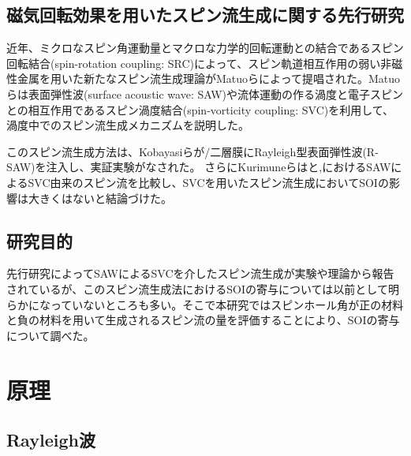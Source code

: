 \documentclass[dvipdfmx,11pt]{jsreport}
\numberwithin{equation}{chapter}
\numberwithin{table}{chapter}
\begin{document}
\section{磁気回転効果を用いたスピン流生成に関する先行研究}
近年、ミクロなスピン角運動量とマクロな力学的回転運動との結合であるスピン回転結合(spin-rotation coupling: SRC)によって、スピン軌道相互作用の弱い非磁性金属を用いた新たなスピン流生成理論がMatuoらによって提唱された\cite{PhysRevB.87.180402}。Matuoらは表面弾性波(surface acoustic wave: SAW)や流体運動の作る渦度と電子スピンとの相互作用であるスピン渦度結合(spin-vorticity coupling: SVC)を利用して、渦度中でのスピン流生成メカニズムを説明した。

このスピン流生成方法は、Kobayasiらが/二層膜にRayleigh型表面弾性波(R-SAW)を注入し、実証実験がなされた\cite{PhysRevLett.119.077202}。
さらにKurimuneらはと,におけるSAWによるSVC由来のスピン流を比較し、SVCを用いたスピン流生成においてSOIの影響は大きくはないと結論づけた\cite{PhysRevB.102.174413}。
\section{研究目的}
先行研究によってSAWによるSVCを介したスピン流生成が実験や理論から報告されているが、このスピン流生成法におけるSOIの寄与については以前として明らかになっていないところも多い。そこで本研究ではスピンホール角が正の材料と負の材料を用いて生成されるスピン流の量を評価することにより、SOIの寄与について調べた。
\chapter{原理}
\section{Rayleigh波}
\end{document}
